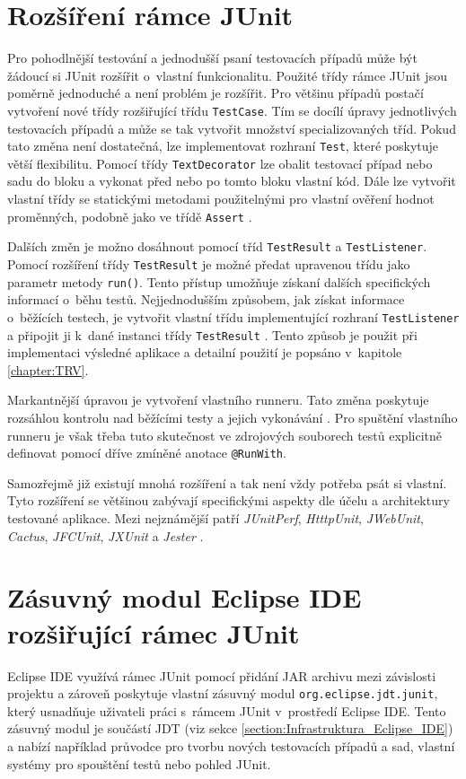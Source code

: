   \section{Rozšíření rámce JUnit}
  \label{section:rozsireni_ramce_junit}
  Pro pohodlnější testování a jednodušší psaní testovacích případů může být žádoucí si JUnit rozšířit o~vlastní funkcionalitu. Použité třídy rámce JUnit jsou poměrně jednoduché a není problém je rozšířit. Pro většinu případů postačí vytvoření nové třídy rozšiřující třídu \texttt{TestCase}. Tím se docílí úpravy jednotlivých testovacích případů a může se tak vytvořit množství specializovaných tříd. Pokud tato změna není dostatečná, lze implementovat rozhraní \texttt{Test}, které poskytuje větší flexibilitu. Pomocí třídy \texttt{TextDecorator} lze obalit testovací případ nebo sadu do bloku a vykonat před nebo po tomto bloku vlastní kód. Dále lze vytvořit vlastní třídy se statickými metodami použitelnými pro vlastní ověření hodnot proměnných, podobně jako ve třídě \texttt{Assert} \cite{JUnitGuide}.

  Dalších změn je možno dosáhnout pomocí tříd \texttt{TestResult} a \texttt{TestListener}. Pomocí rozšíření třídy \texttt{TestResult} je možné předat upravenou třídu jako parametr metody \texttt{run()}. Tento přístup umožňuje získaní dalších specifických informací o~běhu testů. Nejjednodušším způsobem, jak získat informace o~běžících testech, je vytvořit vlastní třídu implementující rozhraní \texttt{TestListener} a připojit ji k~dané instanci třídy \texttt{TestResult} \cite{JUnitGuide}. Tento způsob je použit při implementaci výsledné aplikace a detailní použití je popsáno v~kapitole \ref{chapter:TRV}.

  Markantnější úpravou je vytvoření vlastního runneru. Tato změna poskytuje rozsáhlou kontrolu nad běžícími testy a jejich vykonávání \cite{JUnitGuide}. Pro spuštění vlastního runneru je však třeba tuto skutečnost ve zdrojových souborech testů explicitně definovat pomocí dříve zmíněné anotace \texttt{@RunWith}.

  Samozřejmě již existují mnohá rozšíření a tak není vždy potřeba psát si vlastní. Tyto rozšíření se většinou zabývají specifickými aspekty dle účelu a architektury testované aplikace. Mezi nejznámější patří \emph{JUnitPerf}, \emph{HtttpUnit}, \emph{JWebUnit}, \emph{Cactus}, \emph{JFCUnit}, \emph{JXUnit} a \emph{Jester} \cite{JUnitGuide}.

  \section{Zásuvný modul Eclipse IDE rozšiřující rámec JUnit}
  Eclipse IDE využívá rámec JUnit pomocí přidání JAR archivu mezi závislosti projektu a zároveň poskytuje vlastní zásuvný modul \texttt{org.eclipse.jdt.junit}, který usnadňuje uživateli práci s~rámcem JUnit v~prostředí Eclipse IDE. Tento zásuvný modul je součástí JDT (viz sekce \ref{section:Infrastruktura_Eclipse_IDE}) a nabízí například průvodce pro tvorbu nových testovacích případů a sad, vlastní systémy pro spouštění testů nebo pohled JUnit.

